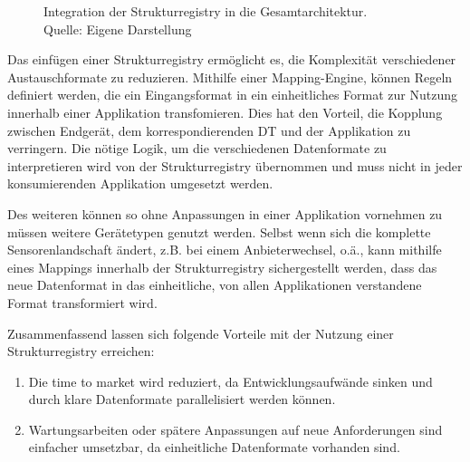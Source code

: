 \begin{figure}
    \centering
    \caption[Integration der Strukturregistry in die Gesamtarchitektur]{Integration der Strukturregistry in die Gesamtarchitektur.\\Quelle: Eigene Darstellung}
\end{figure}

Das einfügen einer Strukturregistry ermöglicht es, die Komplexität verschiedener Austauschformate zu reduzieren. Mithilfe einer Mapping-Engine, können Regeln definiert werden, die ein Eingangsformat in ein einheitliches Format zur Nutzung innerhalb einer Applikation transfomieren. Dies hat den Vorteil, die Kopplung zwischen Endgerät, dem korrespondierenden \ac{DT} und der Applikation zu verringern. Die nötige Logik, um die verschiedenen Datenformate zu interpretieren wird von der Strukturregistry übernommen und muss nicht in jeder konsumierenden Applikation umgesetzt werden.

Des weiteren können so ohne Anpassungen in einer Applikation vornehmen zu müssen weitere Gerätetypen genutzt werden. Selbst wenn sich die komplette Sensorenlandschaft ändert, z.B. bei einem Anbieterwechsel, o.ä., kann mithilfe eines Mappings innerhalb der Strukturregistry sichergestellt werden, dass das neue Datenformat in das einheitliche, von allen Applikationen verstandene Format transformiert wird.

Zusammenfassend lassen sich folgende Vorteile mit der Nutzung einer Strukturregistry erreichen:

\begin{enumerate}
    \item Die time to market wird reduziert, da Entwicklungsaufwände sinken und durch klare Datenformate parallelisiert werden können.
    \item Wartungsarbeiten oder spätere Anpassungen auf neue Anforderungen sind einfacher umsetzbar, da einheitliche Datenformate vorhanden sind.
\end{enumerate}


